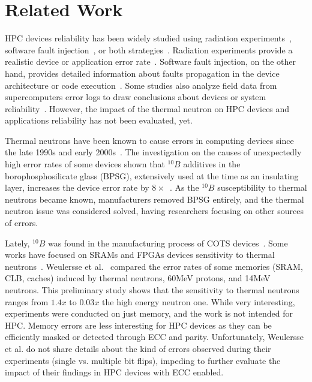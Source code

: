 \section{Related Work}
\label{sec:related}

HPC devices reliability has been widely studied using radiation experiments~\cite{Oliveira2017}, software fault injection~\cite{Wilkening2014, GPUQin, Tan2011}, or both strategies~\cite{Cher2014, SC16}. Radiation experiments provide a realistic device or application error rate~\cite{Baumann2005, ziegler2004ser}. Software fault injection, on the other hand, provides detailed information about faults propagation in the device architecture or code execution~\cite{AVF, PVF}.
Some studies also analyze field data from supercomputers error logs to draw conclusions about devices or system reliability~\cite{sridharan2013feng,sridharan2015}.
However, the impact of the thermal neutron on HPC devices and applications reliability has not been evaluated, yet.

Thermal neutrons have been known to cause errors in computing devices since the late 1990s and early 2000s~\cite{baumann1995boron,normand2006quantifying}. The investigation on the causes of unexpectedly high error rates of some devices shown that $^{10}B$ additives in the borophosphosilicate glass (BPSG), extensively used at the time as an insulating layer, increases the device error rate by $8\times$~\cite{baumann1995boron}. As the $^{10}B$ susceptibility to thermal neutrons became known, manufacturers removed BPSG entirely, and the thermal neutron issue was considered solved, having researchers focusing on other sources of errors.

Lately, $^{10}B$ was found in the manufacturing process of COTS devices~\cite{wen2010b10}. Some works have focused on SRAMs and FPGAs devices sensitivity to thermal neutrons~\cite{lee2015radiation,fang2016characterization,maillard2015neutron}. Weulersse et al.~\cite{weulersse2018contribution} compared the error rates of some memories (SRAM, CLB, caches) induced by thermal neutrons, 60MeV protons, and 14MeV neutrons. This preliminary study shows that the sensitivity to thermal neutrons ranges from $1.4x$ to $0.03x$ the high energy neutron one. While very interesting, experiments were conducted on just memory, and the work is not intended for HPC. Memory errors are less interesting for HPC devices as they can be efficiently masked or detected through ECC and parity. Unfortunately, Weulersse et al. do not share details about the kind of errors observed during their experiments (single vs. multiple bit flips), impeding to further evaluate the impact of their findings in HPC devices with ECC enabled. 

